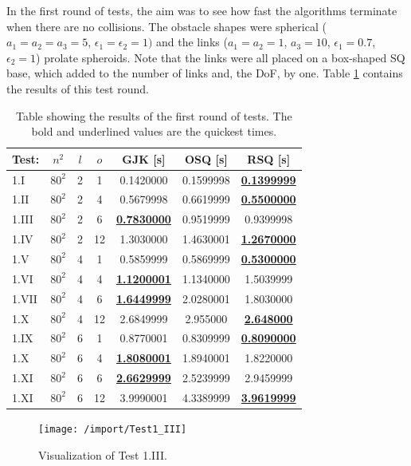 In the first round of tests, the aim was to see how fast the algorithms terminate when there are no collisions. The obstacle shapes were spherical ($a_1=a_2=a_3=5$, $\epsilon_1=\epsilon_2 = 1)$ and the links ($a_1=a_2=1$, $a_3=10$, $\epsilon_1=0.7$, $\epsilon_2 = 1$) prolate spheroids. Note that the links were all placed on a box-shaped \gls{SQ} base, which added to the number of links and, the \gls{DoF}, by one. Table \ref{Table:1} contains the results of this test round.
\begin{table}[h]
	\centering
	\caption{Table showing the results of the first round of tests. The bold and underlined values are the quickest times.}
	\begin{tabular}{|l|c|c|c|c|c|c|}
		\hline
Test: & $n^2$ & $l$	& $o$ & \gls{GJK} [s] & O\gls{SQ} [s] & R\gls{SQ} [s]\\
\hline
		1.I 	& $80^2$	&	2	&	1	&	0.1420000	&	0.1599998   &	\underline{\textbf{0.1399999}}	\\
		1.II 	& $80^2$	&	2	&	4	&	0.5679998	&	0.6619999   &	\underline{\textbf{0.5500000}}	\\
		1.III	& $80^2$  &	2	&	6	&	\underline{\textbf{0.7830000}}	&	0.9519999   &	0.9399998	\\
		1.IV	& $80^2$  &	2	&	12	&	1.3030000	&	1.4630001   &	\underline{\textbf{1.2670000}}	\\
		1.V		& $80^2$	&	4	&	1	&	0.5859999	&	0.5869999   &	\underline{\textbf{0.5300000}}	\\
		1.VI	& $80^2$	&	4	&	4	&	\underline{\textbf{1.1200001}}	&	1.1340000	&	1.5039999	\\
		1.VII	& $80^2$	&	4	&	6	&	\underline{\textbf{1.6449999}}	&	2.0280001	&	1.8030000	\\
		1.X		& $80^2$	&	4	&	12	&	2.6849999	&	2.955000	&	\underline{\textbf{2.648000}}	\\		
		1.IX	& $80^2$	&	6	&	1	&	0.8770001	&	0.8309999	&	\underline{\textbf{0.8090000}}	\\
		1.X		& $80^2$	&	6	&   4	&	\underline{\textbf{1.8080001}}	&	1.8940001	&	1.8220000	\\
		1.XI 	& $80^2$	&	6	&   6	&	\underline{\textbf{2.6629999}}	&	2.5239999	&	2.9459999	\\
		1.XI 	& $80^2$	&	6	&   12	&	3.9990001	&	4.3389999	&	\underline{\textbf{3.9619999}}	\\
		\hline         
	\end{tabular}
	\label{Table:1}
\end{table}

\begin{figure}[h]
	\centering
	\texttt{[image: /import/Test1\_III]}
	\caption{Visualization of Test 1.III.}
	\label{fig:Test1III}
\end{figure}


